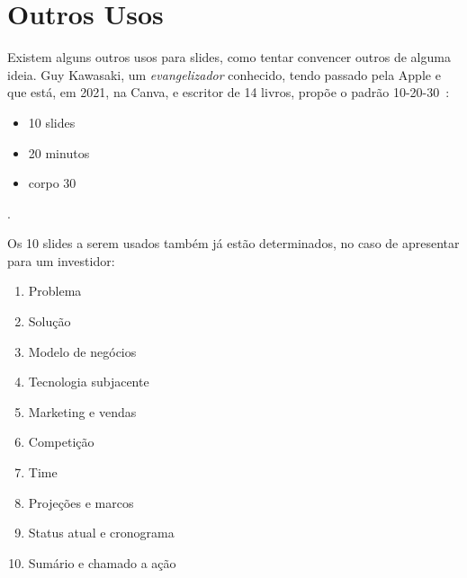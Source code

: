 \section{Outros Usos}

Existem alguns outros usos para slides, como tentar convencer outros de alguma ideia. Guy Kawasaki, um \textit{evangelizador} conhecido, tendo passado pela Apple e que está, em 2021, na Canva, e escritor de 14 livros, propõe o padrão 10-20-30~\citep{kawazaki:2005}:
\begin{itemize}
    \item 10 slides
    \item 20 minutos
    \item corpo 30
\end{itemize}.

Os 10 slides a serem usados também já estão determinados, no caso de apresentar para um investidor:
\begin{enumerate}
    \item Problema
    \item Solução
    \item Modelo de negócios
    \item Tecnologia subjacente
    \item Marketing e vendas
    \item Competição
    \item Time
    \item Projeções e marcos
    \item Status atual e cronograma
    \item Sumário e chamado a ação
\end{enumerate}